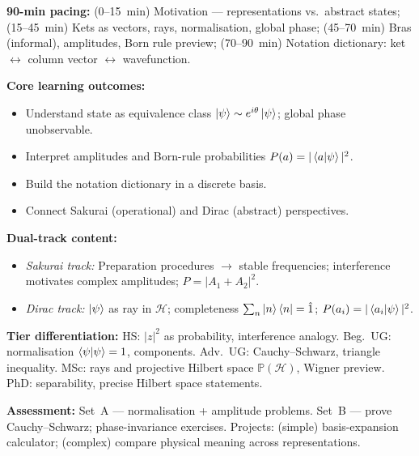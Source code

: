 \documentclass[11pt,a4paper]{article}
\begin{document}
\begin{tcolorbox}[modulebox, title={Module~I.2 --- Lecture L01: Why Dirac Notation? States as Rays \& Superposition}]
\textbf{90-min pacing:} (0--15~min) Motivation --- representations vs.\ abstract states;
(15--45~min) Kets as vectors, rays, normalisation, global phase;
(45--70~min) Bras (informal), amplitudes, Born rule preview;
(70--90~min) Notation dictionary: ket $\leftrightarrow$ column vector $\leftrightarrow$ wavefunction.

\medskip\textbf{Core learning outcomes:}
\begin{itemize}[leftmargin=1.4em,topsep=2pt,itemsep=1pt]
  \item Understand state as equivalence class $\ket{\psi}\sim e^{i\theta}\ket{\psi}$; global phase unobservable.
  \item Interpret amplitudes and Born-rule probabilities $P(a)=|\braket{a|\psi}|^2$.
  \item Build the notation dictionary in a discrete basis.
  \item Connect Sakurai (operational) and Dirac (abstract) perspectives.
\end{itemize}

\medskip\textbf{Dual-track content:}
\begin{itemize}[leftmargin=1.4em,topsep=2pt,itemsep=1pt]
  \item \textit{Sakurai track:} Preparation procedures $\to$ stable frequencies; interference motivates
    complex amplitudes; $P=|A_1+A_2|^2$.
  \item \textit{Dirac track:} $\ket{\psi}$ as ray in $\mathcal{H}$; completeness
    $\sum_n\ket{n}\bra{n}=\hat{1}$; $P(a_i)=|\braket{a_i|\psi}|^2$.
\end{itemize}

\medskip\textbf{Tier differentiation:}
HS: $|z|^2$ as probability, interference analogy.
Beg.\ UG: normalisation $\braket{\psi|\psi}=1$, components.
Adv.\ UG: Cauchy--Schwarz, triangle inequality.
MSc: rays and projective Hilbert space $\mathbb{P}(\mathcal{H})$, Wigner preview.
PhD: separability, precise Hilbert space statements.

\medskip\textbf{Assessment:}
Set~A --- normalisation + amplitude problems.
Set~B --- prove Cauchy--Schwarz; phase-invariance exercises.
Projects: (simple) basis-expansion calculator; (complex) compare physical meaning across representations.
\end{tcolorbox}
\end{document}

